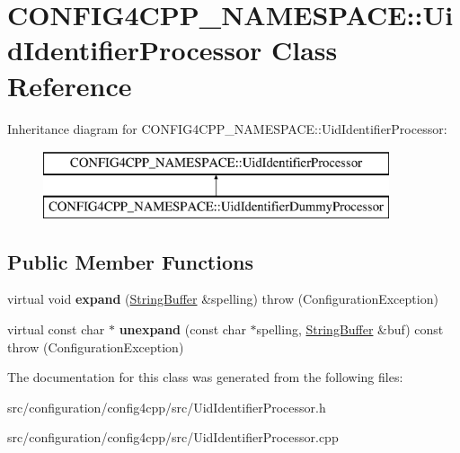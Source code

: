 \hypertarget{classCONFIG4CPP__NAMESPACE_1_1UidIdentifierProcessor}{\section{C\-O\-N\-F\-I\-G4\-C\-P\-P\-\_\-\-N\-A\-M\-E\-S\-P\-A\-C\-E\-:\-:Uid\-Identifier\-Processor Class Reference}
\label{classCONFIG4CPP__NAMESPACE_1_1UidIdentifierProcessor}
}
Inheritance diagram for C\-O\-N\-F\-I\-G4\-C\-P\-P\-\_\-\-N\-A\-M\-E\-S\-P\-A\-C\-E\-:\-:Uid\-Identifier\-Processor\-:\begin{figure}[H]
\begin{center}
\leavevmode
\includegraphics[height=2.000000cm]{classCONFIG4CPP__NAMESPACE_1_1UidIdentifierProcessor}
\end{center}
\end{figure}
\subsection*{Public Member Functions}
\begin{DoxyCompactItemize}
\item 
\hypertarget{classCONFIG4CPP__NAMESPACE_1_1UidIdentifierProcessor_ac79f0ce8bd3b9e269b26d08788e4297a}{virtual void {\bfseries expand} (\hyperlink{classCONFIG4CPP__NAMESPACE_1_1StringBuffer}{String\-Buffer} \&spelling)  throw (\-Configuration\-Exception)}\label{classCONFIG4CPP__NAMESPACE_1_1UidIdentifierProcessor_ac79f0ce8bd3b9e269b26d08788e4297a}

\item 
\hypertarget{classCONFIG4CPP__NAMESPACE_1_1UidIdentifierProcessor_a4b56b56a8c63d54b5151e8d20768507c}{virtual const char $\ast$ {\bfseries unexpand} (const char $\ast$spelling, \hyperlink{classCONFIG4CPP__NAMESPACE_1_1StringBuffer}{String\-Buffer} \&buf) const   throw (\-Configuration\-Exception)}\label{classCONFIG4CPP__NAMESPACE_1_1UidIdentifierProcessor_a4b56b56a8c63d54b5151e8d20768507c}

\end{DoxyCompactItemize}


The documentation for this class was generated from the following files\-:\begin{DoxyCompactItemize}
\item 
src/configuration/config4cpp/src/Uid\-Identifier\-Processor.\-h\item 
src/configuration/config4cpp/src/Uid\-Identifier\-Processor.\-cpp\end{DoxyCompactItemize}
